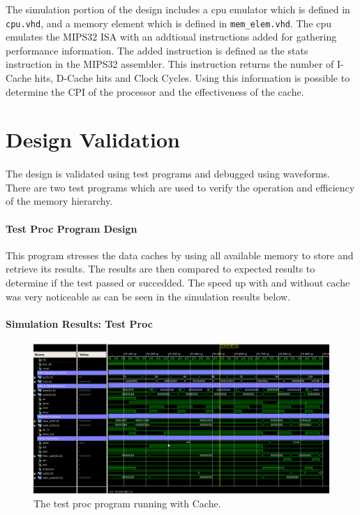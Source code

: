 \documentclass[11pt,letterpaper,]{article}
\begin{document}
The simulation portion of the design includes a cpu emulator which is defined in \verb|cpu.vhd|, and a memory element which is defined in \verb|mem_elem.vhd|.  The cpu emulates the MIPS32 ISA with an addtional instructions added for gathering performance information.  The added instruction is defined as the stats instruction in the MIPS32 assembler.  This instruction returns the number of I-Cache hits, D-Cache hits and Clock Cycles.  Using this information is possible to determine the CPI of the processor and the effectiveness of the cache.

\section{ Design Validation }
\label{Results}
\paragraph{}
The design is validated using test programs and debugged using waveforms. There are two test programs which are used to verify the operation and efficiency of the memory hierarchy.  
\paragraph{ Test Proc Program Design }
This program stresses the data caches by using all available memory to store and retrieve its results.  The results are then compared to expected results to determine if the test passed or succedded.  The speed up with and without cache was very noticeable as can be seen in the simulation results below.  
\paragraph{ Simulation Results: Test Proc }

\begin{figure}[ht]
  \centering
  \includegraphics[width=5.5in]{img/test_proc.png}
  \caption{ The test proc program running with Cache.}
  \label{fig:datapath}
\end{figure}
\end{document}
